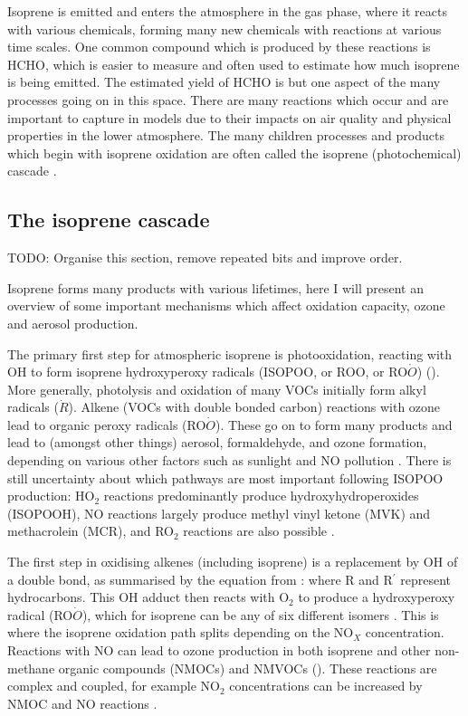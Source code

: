     Isoprene is emitted and enters the atmosphere in the gas phase, where it reacts with various chemicals, forming many new chemicals with reactions at various time scales.
    One common compound which is produced by these reactions is HCHO, which is easier to measure and often used to estimate how much isoprene is being emitted.
    The estimated yield of HCHO is but one aspect of the many processes going on in this space.
    There are many reactions which occur and are important to capture in models due to their impacts on air quality and physical properties in the lower atmosphere.
    The many children processes and products which begin with isoprene oxidation are often called the isoprene (photochemical) cascade \cite{Crounse2012,Paulot2012,Wolfe2016}.
    
  \subsection{The isoprene cascade}
    \label{LR:IsopAndVOCs:IsopCascade}
    TODO: Organise this section, remove repeated bits and improve order.
    
    Isoprene forms many products with various lifetimes, here I will present an overview of some important mechanisms which affect oxidation capacity, ozone and aerosol production.
    
    The primary first step for atmospheric isoprene is photooxidation, reacting with OH to form isoprene hydroxyperoxy radicals (ISOPOO, or ROO, or RO$\dot{O}$) (\cite{Wolfe2016,Marvin2017,Patchen2017}).
    More generally, photolysis and oxidation of many VOCs initially form alkyl radicals ($\dot{R}$).
    Alkene (VOCs with double bonded carbon) reactions with ozone lead to organic peroxy radicals (RO$\dot{O}$). 
    These go on to form many products and lead to (amongst other things) aerosol, formaldehyde, and ozone formation, depending on various other factors such as sunlight and NO pollution \citep{Atkinson2000}.
    There is still uncertainty about which pathways are most important following ISOPOO production: HO$_2$ reactions predominantly produce hydroxyhydroperoxides (ISOPOOH), NO reactions largely produce methyl vinyl ketone (MVK) and methacrolein (MCR), and RO$_2$ reactions are also possible \cite{Liu2016a}.
    
    
    The first step in oxidising alkenes (including isoprene) is a replacement by OH of a double bond, as summarised by the equation from \cite{Patchen2007}:
    where R and R$^{\prime}$ represent hydrocarbons.
    This OH adduct then reacts with O$_2$ to produce a hydroxyperoxy radical (RO$\dot{O}$), which for isoprene can be any of six different isomers \citep{Patchen2007}.
    This is where the isoprene oxidation path splits depending on the NO$_X$ concentration.
    Reactions with NO can lead to ozone production in both isoprene and other non-methane organic compounds (NMOCs) and NMVOCs (\cite{Patchen2007,AtkinsonArey2003}).
    These reactions are complex and coupled, for example NO$_2$ concentrations can be increased by NMOC and NO reactions \citep{AtkinsonArey2003}.
    
